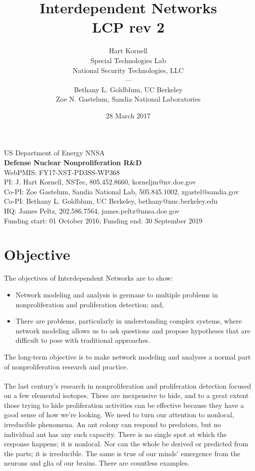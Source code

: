 \documentclass{article} %
\title{Interdependent Networks\\LCP rev 2}
\author{Hart Kornell\\ Special Technologies Lab\\National Security Technologies, LLC\\
---\\
Bethany L. Goldblum, UC Berkeley\\
Zoe N. Gastelum, Sandia National Laboratories}
\date{28 March 2017}
\begin{document}
\maketitle

\vfill
\begin{center}
US Department of Energy NNSA \\
\textbf{Defense Nuclear Nonproliferation R\&D} \\
WebPMIS: FY17-NST-PD3SS-WP368  \\
PI: J. Hart Kornell, NSTec, 805.452.8660, korneljm@nv.doe.gov \\
Co-PI: Zoe Gastelum, Sandia National Lab, 505.845.1002, zgastel@sandia.gov \\
Co-PI: Bethany L. Goldblum, UC Berkeley, bethany@nuc.berkeley.edu \\
HQ: James Peltz, 202.586.7564, james.peltz@nnsa.doe.gov \\
Funding start: 01 October 2016; Funding end: 30 September 2019
\end{center}
\newpage
\thispagestyle{empty}
\mbox{}
\newpage

\newpage

\onehalfspace

\tableofcontents{}

\newpage
\thispagestyle{empty}
\mbox{}
\newpage

\section{Objective}
The objectives of Interdependent Networks are to show:
\renewcommand\labelitemi{\tiny$\bullet$}
\begin{itemize}
\item Network modeling and analysis is germane to multiple problems in nonproliferation and proliferation detection; and,
\item There are problems, particularly in understanding complex systems, where network modeling allows us to ask questions and propose hypotheses that are difficult to pose with traditional approaches.
\end{itemize}
The long-term objective is to make network modeling and analyses a normal part of nonproliferation research and practice.\\
\\
\noindent The last century's research in nonproliferation and proliferation detection focused on a few elemental isotopes. These are inexpensive to hide, and to a great extent those trying to hide proliferation activities can be effective because they have a good sense of how we're looking. We need to turn our attention to nonlocal, irreducible phenomena. An ant colony can respond to predators, but no individual ant has any such capacity. There is no single spot at which the response happens; it is nonlocal. Nor can the whole be derived or predicted from the parts; it is irreducible. The same is true of our minds' emergence from the neurons and glia of our brains. There are countless examples.  
\end{document}

